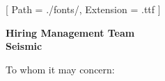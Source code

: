 


\renewcommand{\photo}[2]{}

\geometry{
  left=2cm,
  right=2cm,
  top=2cm,
  bottom=2cm
}



\makecvheader

\setmainfont{NotoSans-Regular}[
  Path = ./fonts/,
  Extension = .ttf
]

\vspace{1cm}
\indent\textbf{Hiring Management Team}\\
\indent\textbf{Seismic}

\vspace{0.5cm}

\noindent To whom it may concern:

\vspace{0.5cm}

